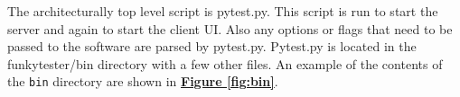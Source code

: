 \documentclass{report}
\begin{document}
The architecturally top level script is pytest.py. This script is run to start the server and again to start the client UI. Also any options or flags that need to be passed to the software are parsed by pytest.py. Pytest.py is located in the funkytester/bin directory with a few other files. An example of the contents of the \texttt{bin} directory are shown in \hyperref[fig:bin]{\textbf{Figure \ref{fig:bin}}}.

\vspace{12pt}%
	\begin{minipage}{\linewidth}
		\label{fig:bin}
	\end{minipage}
\end{document}
